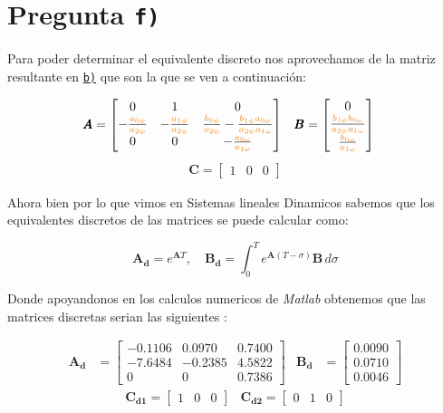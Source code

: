 \section{Pregunta \texttt{f)}}\label{pregunta-f}

Para poder determinar el equivalente discreto nos aprovechamos de la matriz
resultante en \hyperref[pregunta-b]{\texttt{b)}} que son la que se ven a continuación:

\begin{align}
    \pmb{A} &= \begin{bmatrix}
        0 & 1 & 0 \\
        -\frac{\nara{a_{0\psi}}}{\nara{a_{2\psi}}}   & -\frac{\nara{a_{1\psi}}}{\nara{a_{2\psi}}} & \frac{\nara{b_{0\psi}}}{\nara{a_{2\psi}}} - \frac{\nara{b_{1\psi}}\nara{a_{0\omega}}}{\nara{a_{2\psi}}\nara{a_{1\omega}}} \\
        0 & 0 & -\frac{\nara{a_{0\omega}}}{\nara{a_{1\omega}}}
    \end{bmatrix} &
    \pmb{B} &= \begin{bmatrix}
        0 \\
        \frac{\nara{b_{1\psi}}\nara{b_{0\omega}}}{\nara{a_{2\psi}}\nara{a_{1\omega}}} \\
        \frac{\nara{b_{0\omega}}}{\nara{a_{1\omega}}}
    \end{bmatrix}
  \end{align}
  \begin{align}
    \pmb{C} = \begin{bmatrix}
      1 & 0 & 0
    \end{bmatrix}
  \end{align}

Ahora bien por lo que vimos en Sistemas lineales Dinamicos sabemos que los
equivalentes discretos de las matrices se puede calcular como:

\[
\mathbf{A_d}= e^{\mathbf{A}T} ,\quad \mathbf{B_d}= \int_{0}^{T} e^{\mathbf{A}(T-\sigma)}\mathbf{B}  \,d\sigma 
\]

Donde apoyandonos en los calculos numericos de \textit{Matlab} obtenemos que las
matrices discretas serian las siguientes :


\begin{align}
    \mathbf{A_d} &= \begin{bmatrix}
        -0.1106 & 0.0970 & 0.7400 \\
        -7.6484 &  -0.2385 & 4.5822 \\
        0 & 0 & 0.7386
    \end{bmatrix} &
    \mathbf{B_d} &= \begin{bmatrix}
        0.0090 \\
        0.0710 \\
        0.0046
    \end{bmatrix}
  \end{align}
  \begin{align}
    \pmb{C_{d1}} = \begin{bmatrix}
      1 & 0 & 0
    \end{bmatrix}&
    \pmb{C_{d2}} = \begin{bmatrix}
      0 & 1 & 0
    \end{bmatrix}
\end{align}

